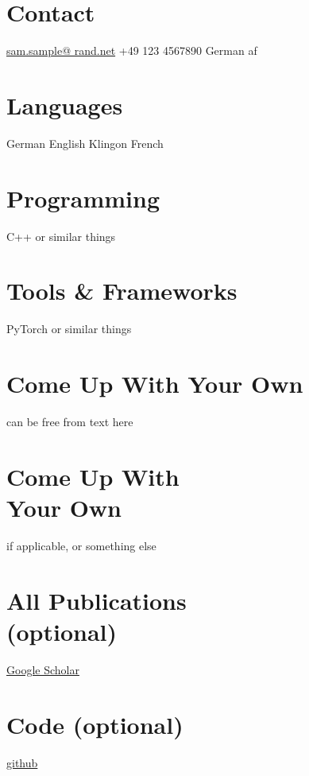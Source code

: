 \documentclass[letterpaper,11pt]{dolce-cv} %
\begin{document}
	
	\begin{aside}
		\section{Contact}
		\href{mailto:sam@sample.net}{sam.sample@
			rand.net}
		+49 123 4567890
		German af
		\section{Languages}
		German \fouroffour
		English \threeoffour
		Klingon \twooffour
		French \oneoffour
		\section{Programming}
		C++ \fouroffour
		or \threeoffour
		similar \twooffour
		things \oneoffour
		\section{Tools \&
		Frameworks}
		PyTorch \fouroffour
		or \threeoffour
		similar \twooffour
		things \oneoffour
		\section{Come Up With Your Own}
		can be free from
		text here
		\section{Come Up With \\ Your Own}
		if applicable, or something else
		\section{All Publications \\ (optional)}
		\href{https://scholar.google.de/citations?user=YOUR-ID}{Google Scholar \aiGoogleScholar}%
		\section{Code (optional)}
		\href{https://github.com/YOUR-ID/}{github \normalsize\faGithub}%
	\end{aside}
\end{document}
